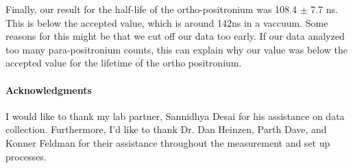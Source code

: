 \documentclass[10pt,letterpaper]{article}
\begin{document}
Finally, our result for the half-life of the ortho-positronium was 108.4 $\pm$ 7.7 ns. This is below the accepted value, which is around 142ns in a vaccuum. Some reasons for this might be that we cut off our data too early. 
If our data analyzed too many para-positronium counts, this can explain why our value was below the accepted value for the lifetime of the ortho positronium.
\paragraph*{Acknowledgments}
I would like to thank my lab partner, Sannidhya Desai for his assistance on data
collection. Furthermore, I'd like to thank Dr. Dan Heinzen,
Parth Dave, and Konner Feldman for their assistance throughout the measurement and 
set up processes.

\end{document}
